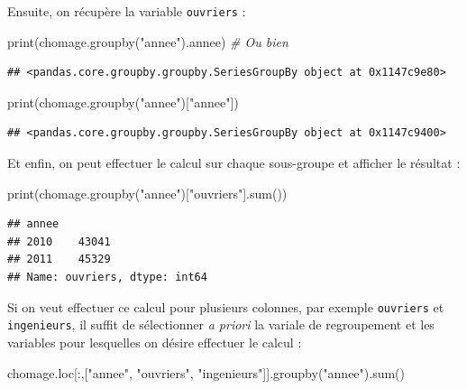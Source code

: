 \documentclass[12pt,]{book}
\newenvironment{Shaded}{\begin{snugshade}}{\end{snugshade}}
\newcommand{\StringTok}[1]{\textcolor[rgb]{0.31,0.60,0.02}{#1}}
\newcommand{\CommentTok}[1]{\textcolor[rgb]{0.56,0.35,0.01}{\textit{#1}}}
\newcommand{\BuiltInTok}[1]{#1}
\newcommand{\NormalTok}[1]{#1}
\numberwithin{equation}{section}
\numberwithin{countremarque}{section}
\begin{document}
Ensuite, on récupère la variable \texttt{ouvriers} :

\begin{Shaded}
\begin{Highlighting}[]
\BuiltInTok{print}\NormalTok{(chomage.groupby(}\StringTok{"annee"}\NormalTok{).annee)}
\CommentTok{# Ou bien}
\end{Highlighting}
\end{Shaded}

\begin{lstlisting}
## <pandas.core.groupby.groupby.SeriesGroupBy object at 0x1147c9e80>
\end{lstlisting}

\begin{Shaded}
\begin{Highlighting}[]
\BuiltInTok{print}\NormalTok{(chomage.groupby(}\StringTok{"annee"}\NormalTok{)[}\StringTok{"annee"}\NormalTok{])}
\end{Highlighting}
\end{Shaded}

\begin{lstlisting}
## <pandas.core.groupby.groupby.SeriesGroupBy object at 0x1147c9400>
\end{lstlisting}

Et enfin, on peut effectuer le calcul sur chaque sous-groupe et afficher
le résultat :

\begin{Shaded}
\begin{Highlighting}[]
\BuiltInTok{print}\NormalTok{(chomage.groupby(}\StringTok{"annee"}\NormalTok{)[}\StringTok{"ouvriers"}\NormalTok{].}\BuiltInTok{sum}\NormalTok{())}
\end{Highlighting}
\end{Shaded}

\begin{lstlisting}
## annee
## 2010    43041
## 2011    45329
## Name: ouvriers, dtype: int64
\end{lstlisting}

Si on veut effectuer ce calcul pour plusieurs colonnes, par exemple
\texttt{ouvriers} et \texttt{ingenieurs}, il suffit de sélectionner
\emph{a priori} la variale de regroupement et les variables pour
lesquelles on désire effectuer le calcul :

\begin{Shaded}
\begin{Highlighting}[]
\NormalTok{chomage.loc[:,[}\StringTok{"annee"}\NormalTok{, }\StringTok{"ouvriers"}\NormalTok{, }\StringTok{"ingenieurs"}\NormalTok{]].groupby(}\StringTok{"annee"}\NormalTok{).}\BuiltInTok{sum}\NormalTok{()}
\end{Highlighting}
\end{Shaded}
\end{document}
